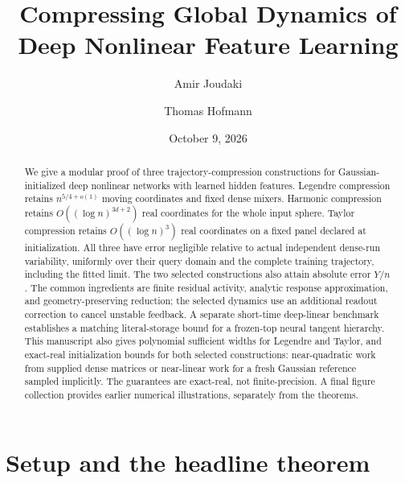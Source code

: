 \documentclass[11pt]{article}
\title{Compressing Global Dynamics of Deep Nonlinear Feature Learning}
\author{Amir Joudaki \and Thomas Hofmann}
\date{October 9, 2026}
\theoremstyle{definition}
\theoremstyle{remark}
\begin{document}
\maketitle
\begin{abstract}
We give a modular proof of three trajectory-compression constructions for
Gaussian-initialized deep nonlinear networks with learned hidden features.
Legendre compression retains $n^{5/4+o(1)}$ moving coordinates and fixed dense
mixers. Harmonic compression retains $O((\log n)^{3d+2})$ real coordinates
for the whole input sphere. Taylor compression retains
$O((\log n)^3)$ real coordinates on a fixed panel declared at initialization.
All three have error negligible relative to actual independent dense-run
variability, uniformly over their query domain and the complete training
trajectory, including the fitted limit. The two selected constructions also
attain absolute error $Y/n$. The common ingredients are finite residual
activity, analytic response approximation, and geometry-preserving reduction;
the selected dynamics use an additional readout correction to cancel unstable
feedback. A separate short-time deep-linear benchmark establishes a matching
literal-storage bound for a frozen-top neural tangent hierarchy. This
manuscript also gives polynomial sufficient widths for Legendre and Taylor,
and exact-real initialization bounds for both selected constructions:
near-quadratic work from supplied dense matrices or near-linear work for a
fresh Gaussian reference sampled implicitly. The guarantees are exact-real,
not finite-precision. A final figure collection provides earlier numerical
illustrations, separately from the theorems.
\end{abstract}

\section{Setup and the headline theorem}
\label{cp:setup}
\end{document}
